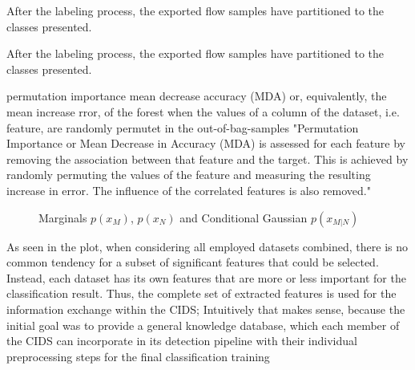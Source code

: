 \documentclass[../../main.tex]{subfiles}
\begin{document}
\begin{table}
    \footnotesize
    \centering
    \setlength{\extrarowheight}{0pt}
    \addtolength{\extrarowheight}{\aboverulesep}
    \addtolength{\extrarowheight}{\belowrulesep}
    \setlength{\aboverulesep}{0pt}
    \setlength{\belowrulesep}{0pt}
    \setlength{\extrarowheight}{.1em}
     
    \caption[Preprocessed Flows]{After the labeling process, the exported flow samples have partitioned to the classes presented.}
    \label{tab:preprocessed_flows}
\end{table}


\begin{table}
    \footnotesize
    \centering
    \setlength{\extrarowheight}{0pt}
    \addtolength{\extrarowheight}{\aboverulesep}
    \addtolength{\extrarowheight}{\belowrulesep}
    \setlength{\aboverulesep}{0pt}
    \setlength{\belowrulesep}{0pt}
    \setlength{\extrarowheight}{.1em}
     
    \caption[Extracted Flow Features]{After the labeling process, the exported flow samples have partitioned to the classes presented.}
    \label{tab:flow_features}
\end{table}


permutation importance \cite[125]{rforests_2014}
mean decrease accuracy (MDA) or, equivalently, the mean increase rror, of the forest when the values of a column of the dataset, i.e. feature, are randomly permutet in the out-of-bag-samples
"Permutation Importance or Mean Decrease in Accuracy (MDA) is assessed for each feature by removing the association between that feature and the target. This is achieved by randomly permuting the values of the feature and measuring the resulting increase in error. The influence of the correlated features is also removed."
\begin{figure}[t!]
    \centering
    
    \caption{Marginals $p(x_M)$, $p(x_N)$ and Conditional Gaussian $p(x_{M|N})$}
    \label{fig:marginal_conditional_gaussian}
\end{figure}

As seen in the plot, when considering all employed datasets combined, there is no common tendency for a subset of significant features that could be selected. Instead, each dataset has its own features that are more or less important for the classification result. Thus, the complete set of extracted features is used for the information exchange within the CIDS; Intuitively that makes sense, because the initial goal was to provide a general knowledge database, which each member of the CIDS can incorporate in its detection pipeline with their individual preprocessing steps for the final classification training
\end{document}
